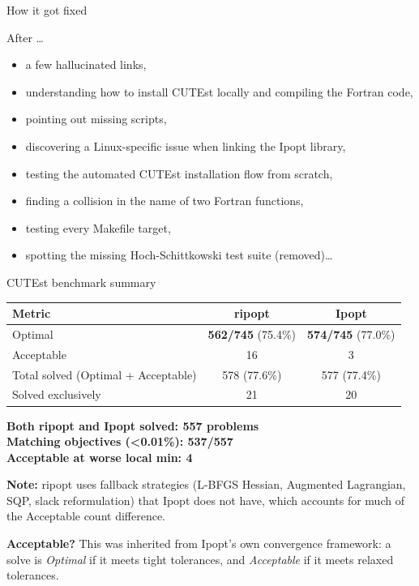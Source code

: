 \documentclass{beamer}
\begin{document}
\begin{frame}{How it got fixed}

  After \dots

  \begin{itemize}
    \item a few hallucinated links,
    \item understanding how to install CUTEst locally and compiling the Fortran code,
    \item pointing out missing scripts,
    \item discovering a Linux-specific issue when linking the Ipopt library,
    \item testing the automated CUTEst installation flow from scratch,
    \item finding a collision in the name of two Fortran functions,
    \item testing every Makefile target,
    \item spotting the missing Hoch-Schittkowski test suite (removed)\dots
  \end{itemize}

\end{frame}

\begin{frame}{CUTEst benchmark summary}
  \centering
  \footnotesize
  \begin{tabular}{@{}lcc@{}}
    \toprule
    Metric                              & ripopt                    & Ipopt                     \\
    \midrule
    Optimal                             & \textbf{562/745} (75.4\%) & \textbf{574/745} (77.0\%) \\
    Acceptable                          & 16                        & 3                         \\
    Total solved (Optimal + Acceptable) & 578 (77.6\%)              & 577 (77.4\%)              \\
    Solved exclusively                  & 21                        & 20                        \\
    \bottomrule
  \end{tabular}

  \textbf{Both ripopt and Ipopt solved: 557 problems} \\
  \textbf{Matching objectives (\textless 0.01\%): 537/557} \\
  \textbf{Acceptable at worse local min: 4}

  \vfill

  \textbf{Note:} ripopt uses fallback strategies (L-BFGS Hessian, Augmented Lagrangian, SQP, slack reformulation) that Ipopt does not have, which accounts for much of the Acceptable count difference.

  \vfill

  \textbf{Acceptable?} This was inherited from Ipopt's own convergence framework: a solve is \emph{Optimal} if it meets tight tolerances, and \emph{Acceptable} if it meets relaxed tolerances.

\end{frame}
\end{document}
